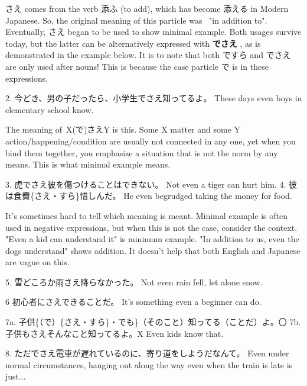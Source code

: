 \par{ さえ comes from the verb 添ふ (to add), which has become 添える in Modern Japanese. So, the original meaning of this particle was  "in addition to". Eventually, さえ began to be used to show minimal example. Both usages survive today, but the latter can be alternatively expressed with \textbf{でさえ }, as is demonstrated in the example below. It is to note that both ですら and でさえ are only used after nouns! This is because the case particle で is in these expressions. }

\par{2. 今どき、男の子だったら、小学生でさえ知ってるよ。 \hfill\break
These days even boys in elementary school know. }

\par{ The meaning of X(で)さえY is this. Some X matter and some Y action\slash happening\slash condition are usually not connected in any one, yet when you bind them together, you emphasize a situation that is not the norm by any means. This is what minimal example means. }

\par{3. 虎でさえ彼を傷つけることはできない。 \hfill\break
Not even a tiger can hurt him. }
4. 彼は食費\{さえ・すら\}惜しんだ。 \hfill\break
He even begrudged taking the money for food. 
\par{ It's sometimes hard to tell which meaning is meant. Minimal example is often used in negative expressions, but when this is not the case, consider the context. "Even a kid can understand it" is minimum example. "In addition to us, even the dogs understand" shows addition. It doesn't help that both English and Japanese are vague on this. }

\par{5. 雪どころか雨さえ降らなかった。 \hfill\break
Not even rain fell, let alone snow. }

\par{6 初心者にさえできることだ。 \hfill\break
It's something even a beginner can do. }

\par{7a. 子供\{（で）\{さえ・すら\}・でも\}（そのこと）知ってる（ことだ）よ。〇 \hfill\break
7b. 子供もさえそんなこと知ってるよ。X \hfill\break
Even kids know that. }

\par{8. ただでさえ電車が遅れているのに、寄り道をしようだなんて。 \hfill\break
Even under normal circumstances, hanging out along the way even when the train is late is just\dothyp{}\dothyp{}\dothyp{} }

